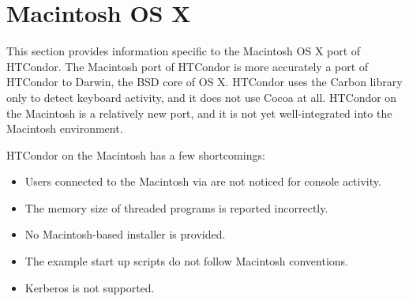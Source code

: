 \section{\label{sec:platform-macos}Macintosh OS X}

This section provides information specific to the Macintosh OS X port of
HTCondor.
The Macintosh port of HTCondor is more accurately a port of HTCondor to
Darwin, the BSD core of OS X. HTCondor uses the Carbon library only to
detect keyboard activity, and it does not use Cocoa at all.
HTCondor on the Macintosh is a relatively new port, and it 
is not yet well-integrated
into the Macintosh environment. 

HTCondor on the Macintosh has a few shortcomings:
\begin{itemize}
\item Users connected to the Macintosh via  are not
noticed for console activity.
\item The memory size of threaded programs is reported incorrectly.
\item No Macintosh-based installer is provided.
\item The example start up scripts do not follow Macintosh conventions.
\item Kerberos is not supported.
\end{itemize}

